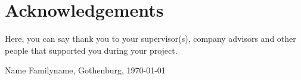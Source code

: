 \thispagestyle{plain}			%
\section*{Acknowledgements}
Here, you can say thank you to your supervisor(s), company advisors and other people that supported you during your project.

\vspace{1.5cm}
\hfill
Name Familyname, Gothenburg, \today

\newpage				%
\thispagestyle{empty}
\mbox{}